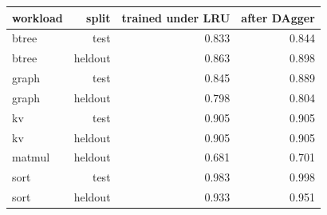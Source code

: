 \begin{tabular}{lrrr}
\toprule
workload & split & trained under LRU & after DAgger \\
\midrule
btree & test & 0.833 & 0.844 \\
btree & heldout & 0.863 & 0.898 \\
graph & test & 0.845 & 0.889 \\
graph & heldout & 0.798 & 0.804 \\
kv & test & 0.905 & 0.905 \\
kv & heldout & 0.905 & 0.905 \\
matmul & heldout & 0.681 & 0.701 \\
sort & test & 0.983 & 0.998 \\
sort & heldout & 0.933 & 0.951 \\
\bottomrule
\end{tabular}
